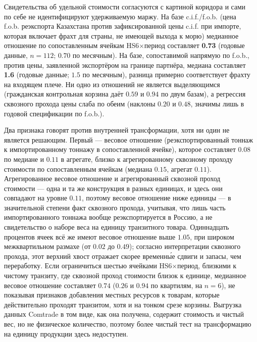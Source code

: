 \documentclass[12pt]{article}
\begin{document}
Свидетельства об удельной стоимости согласуются с картиной коридора и сами по себе не
идентифицируют удерживаемую маржу. На базе c.i.f./f.o.b. (цена f.o.b. реэкспорта Казахстана
против зафиксированной цены c.i.f. при импорте, которая включает фрахт для страны, не
имеющей выхода к морю) медианное отношение по сопоставленным ячейкам HS6$\times$период
составляет \textbf{0.73} (годовые данные, $n = 112$; $0.70$ по месячным). На базе,
сопоставимой напрямую по f.o.b., против цены, заявленной экспортёром на границе партнёра,
медиана составляет \textbf{1.6} (годовые данные; $1.5$ по месячным), разница примерно
соответствует фрахту на входящем плече. Ни одно из отношений не является выделяющимся
(гражданская контрольная корзина даёт $0.59$ и $0.94$ по двум базам), а регрессия
сквозного прохода цены слаба по обеим (наклоны $0.20$ и $0.48$, значимы лишь в годовой
спецификации по f.o.b.).

Два признака говорят против внутренней трансформации, хотя ни один не является решающим.
Первый — весовое отношение (реэкспортированный тоннаж к импортированному тоннажу в
сопоставленной ячейке), которое составляет $0.08$ по медиане и $0.11$ в агрегате, близко к
агрегированному сквозному проходу стоимости по сопоставленным ячейкам (медиана $0.15$,
агрегат $0.11$). Агрегированное весовое отношение и агрегированный сквозной проход стоимости
— одна и та же конструкция в разных единицах, и здесь они совпадают на уровне $0.11$,
поэтому весовое отношение ниже единицы — в значительной степени факт сквозного прохода,
учитывая, что лишь часть импортированного тоннажа вообще реэкспортируется в Россию, а не
свидетельство о наборе веса на единицу транзитного товара. Одиннадцать процентов ячеек всё
же имеют весовое отношение выше $1.05$, при широком межквартильном размахе (от $0.02$ до
$0.49$); согласно интерпретации сквозного прохода, этот верхний хвост отражает скорее
временны́е сдвиги и запасы, чем переработку. Если ограничиться шестью ячейками
HS6$\times$период, близкими к чистому транзиту, где сквозной проход стоимости близок к
единице, медианное весовое отношение составляет $0.74$ ($0.26$ и $0.94$ по квартилям, на
$n = 6$), не показывая признаков добавления местных ресурсов к товарам, которые
действительно проходят транзитом, хотя и на тонком срезе корзины. Выгрузка данных Comtrade
в том виде, как она получена, содержит стоимость и чистый вес, но не физическое количество,
поэтому более чистый тест на трансформацию на единицу продукции здесь недоступен.
\end{document}
